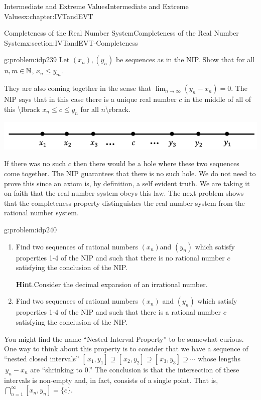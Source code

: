 \begin{chapterptx}{Intermediate and Extreme Values}{}{Intermediate and Extreme Values}{}{}{x:chapter:IVTandEVT}
\begin{sectionptx}{Completeness of the Real Number System}{}{Completeness of the Real Number System}{}{}{x:section:IVTandEVT-Completeness}
\begin{problem}{}{g:problem:idp239}
			Let \((x_n), (y_n)\) be sequences as in the NIP. Show that for all \(n, m \in\mathbb {N}\), \(x_n\le y_m\).%
		\end{problem}
		They are also coming together in the sense that \(\lim_{n\rightarrow\infty}\left(y_n-x_n\right)=0\).  The NIP says that in this case there is a unique real number \(c\) in the middle of all of this \textbackslash{}lbrack \(x_n\leq c\leq y_n\) for all \(n\)\textbackslash{}rbrack.%
		\begin{image}{0.125}{0.75}{0.125}%
			\includegraphics[width=\linewidth]{external/images/Ch6fig4.png}
		\end{image}%
		If there was no such \(c\) then there would be a hole where these two sequences come together.  The NIP guarantees that there is no such hole.  We do not need to prove this since an axiom is, by definition, a self evident truth.  We are taking it on faith that the real number system obeys this law.  The next problem shows that the completeness property distinguishes the real number system from the rational number system.%
		\begin{problem}{}{g:problem:idp240}%
			\begin{enumerate}[font=\bfseries,label=(\alph*),ref=\alph*]
				\item{}Find two sequences of rational numbers \(\left(x_n\right)\)and \(\left(y_n\right)\) which satisfy properties 1-4 of the NIP and such that there is no rational number \(c\) satisfying the conclusion of the NIP.%
				\par\smallskip%
				\noindent\textbf{\blocktitlefont Hint}.\hypertarget{g:hint:idp241}{}\quad{}Consider the decimal expansion of an irrational number.%
				\item{}Find two sequences of rational numbers \(\left(x_n\right)\) and \(\left(y_n\right)\) which satisfy properties 1-4 of the NIP and such that there is a rational number \(c\) satisfying the conclusion of the NIP.%
			\end{enumerate}
		\end{problem}
		You might find the name ``Nested Interval Property'' to be somewhat curious. One way to think about this property is to consider that we have a sequence of ``nested closed intervals'' \([\,x_1,y_1]\supseteq[\,x_2,y_2]\supseteq[\,x_3,y_3]\supseteq\cdots\) whose lengths \(\,y_n-x_n\) are ``shrinking to \(0\).'' The conclusion is that the intersection of these intervals is non-empty and, in fact, consists of a single point. That is, \(\bigcap_{n=1}^\infty[x_n,y_n]=\{c\}\).%

\end{sectionptx}
\end{chapterptx}
